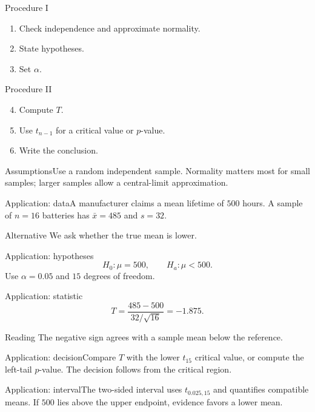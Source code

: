 \documentclass[10pt,aspectratio=169]{beamer}
\begin{document}
\begin{frame}{Procedure I}\small\begin{enumerate}\item Check independence and approximate normality.\item State hypotheses.\item Set $\alpha$.\end{enumerate}\end{frame}
\begin{frame}{Procedure II}\small\begin{enumerate}\setcounter{enumi}{3}\item Compute $T$.\item Use $t_{n-1}$ for a critical value or $p$-value.\item Write the conclusion.\end{enumerate}\end{frame}
\begin{frame}{Assumptions}\small Use a random independent sample. Normality matters most for small samples; larger samples allow a central-limit approximation.\end{frame}
\begin{frame}{Application: data}\small A manufacturer claims a mean lifetime of $500$ hours. A sample of $n=16$ batteries has $\bar x=485$ and $s=32$.\begin{block}{Alternative} We ask whether the true mean is lower.\end{block}\end{frame}
\begin{frame}{Application: hypotheses}\small\[H_0:\mu=500,\qquad H_a:\mu<500.\]Use $\alpha=0.05$ and $15$ degrees of freedom.\end{frame}
\begin{frame}{Application: statistic}\small\[T=\frac{485-500}{32/\sqrt{16}}=-1.875.\]\begin{block}{Reading} The negative sign agrees with a sample mean below the reference.\end{block}\end{frame}
\begin{frame}{Application: decision}\small Compare $T$ with the lower $t_{15}$ critical value, or compute the left-tail $p$-value. The decision follows from the critical region.\end{frame}
\begin{frame}{Application: interval}\small The two-sided interval uses $t_{0.025,15}$ and quantifies compatible means. If $500$ lies above the upper endpoint, evidence favors a lower mean.\end{frame}
\end{document}
